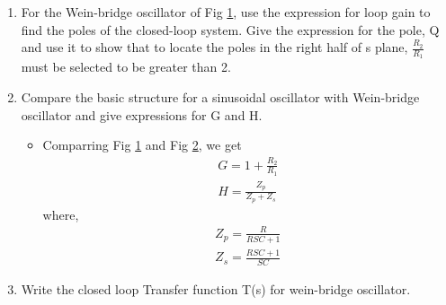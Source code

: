 \begin{enumerate}[label=\arabic*.,ref=\theenumi]

\item  For the Wein-bridge oscillator of Fig \ref{fig:ee18btech11044_3_tikz_1}, use the expression for loop gain to find the poles of the closed-loop system. Give the expression for the pole, Q and use it to show that to locate the poles in the right half of s plane, $\frac{R_2}{R_1}$ must be selected to be greater than 2. 
\renewcommand{\thefigure}{\theenumi.\arabic{figure}}
\begin{figure}[!hbt]
	\begin{center}
			\resizebox{\columnwidth}{!}{}
	\end{center}
\caption{}
\label{fig:ee18btech11044_3_tikz_1}
\end{figure}



\item Compare the basic structure for a sinusoidal oscillator with Wein-bridge oscillator and give expressions for G and H. 

\solution
\begin{itemize}
 \item Comparring Fig \ref{fig:ee18btech11044_3_tikz_1} and Fig \ref{fig:ee18btech11044_3_tikz_2}, we get
\begin{align}
G = 1+\frac{R_2}{R_1} \label{eq:ee18btech11044_3_1}\\
H = \frac{Z_p}{Z_p + Z_s}  \label{eq:ee18btech11044_3_2}
\end{align}
where,
\begin{align}
    Z_p = \frac{R}{RSC+1} \\
    Z_s = \frac{RSC+1}{SC}
\end{align}
\end{itemize}



\begin{figure}[!hbt]
	\begin{center}
		\resizebox{\columnwidth}{!}{}
	\end{center}
\caption{}
\label{fig:ee18btech11044_3_tikz_2}
\end{figure} 


\item Write the closed loop Transfer function T(s) for wein-bridge oscillator.


\end{enumerate}
